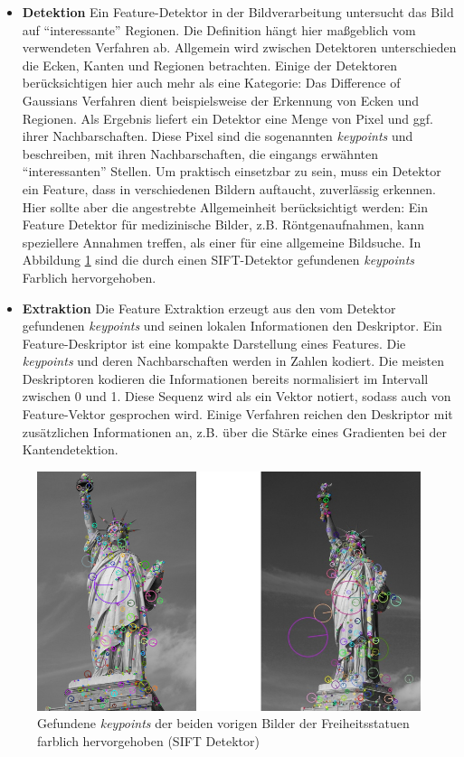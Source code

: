 \begin{itemize}
	\item \textbf{Detektion} Ein Feature-Detektor in der Bildverarbeitung untersucht das Bild auf \enquote{interessante} Regionen. Die Definition hängt hier maßgeblich vom verwendeten Verfahren ab. Allgemein wird zwischen Detektoren unterschieden die Ecken, Kanten und Regionen betrachten. Einige der Detektoren berücksichtigen hier auch mehr als eine Kategorie: Das Difference of Gaussians Verfahren dient beispielsweise der Erkennung von Ecken und Regionen. Als Ergebnis liefert ein Detektor eine Menge von Pixel und ggf. ihrer Nachbarschaften. Diese Pixel sind die sogenannten \textit{keypoints} und beschreiben, mit ihren Nachbarschaften, die eingangs erwähnten \enquote{interessanten} Stellen.\newline
	 Um praktisch einsetzbar zu sein, muss ein Detektor ein Feature, dass in verschiedenen Bildern auftaucht, zuverlässig erkennen. Hier sollte aber die angestrebte Allgemeinheit berücksichtigt werden: Ein Feature Detektor für medizinische Bilder, z.B. Röntgenaufnahmen, kann speziellere Annahmen treffen, als einer für eine allgemeine Bildsuche. In Abbildung \ref{img:keypoints} sind die durch einen SIFT-Detektor gefundenen \textit{keypoints} Farblich hervorgehoben.
	\item \textbf{Extraktion} Die Feature Extraktion erzeugt aus den vom Detektor gefundenen \textit{keypoints} und seinen lokalen Informationen den Deskriptor. Ein Feature-Deskriptor ist eine kompakte Darstellung eines Features. Die \textit{keypoints} und deren Nachbarschaften werden in Zahlen kodiert. Die meisten Deskriptoren kodieren die Informationen bereits normalisiert im Intervall zwischen 0 und 1. Diese Sequenz wird als ein Vektor notiert, sodass auch von Feature-Vektor gesprochen wird. Einige Verfahren reichen den Deskriptor mit zusätzlichen Informationen an, z.B. über die Stärke eines Gradienten bei der Kantendetektion.
\end{itemize}

\begin{figure}
	\centering
	\includegraphics[scale=0.6]{images/liberty_kp.png}
	\caption{Gefundene \textit{keypoints} der beiden vorigen Bilder der Freiheitsstatuen farblich hervorgehoben (SIFT Detektor)}
	\label{img:keypoints}
\end{figure}

